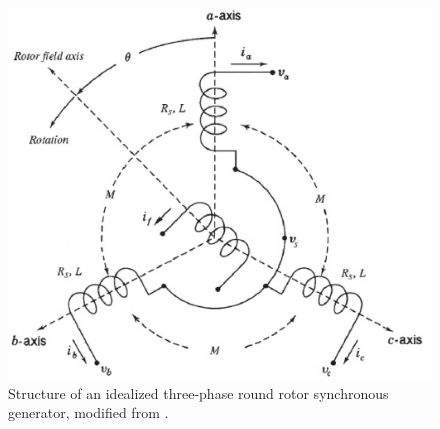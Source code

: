 \documentclass[letterpaper, 10 pt, conference]{ieeeconf}  %
\begin{document}
\begin{figure}
\begin{centering}
\includegraphics[scale=0.5]{SGStucture}
\par\end{centering} \label{fig:structOfSG}

\caption[Structure of an idealized three-phase round rotor synchronous
generator]{Structure of an idealized three-phase round rotor
synchronous generator, modified from \cite[Figure 3.4]{GrSt2014}.}
\end{figure}
\end{document}
